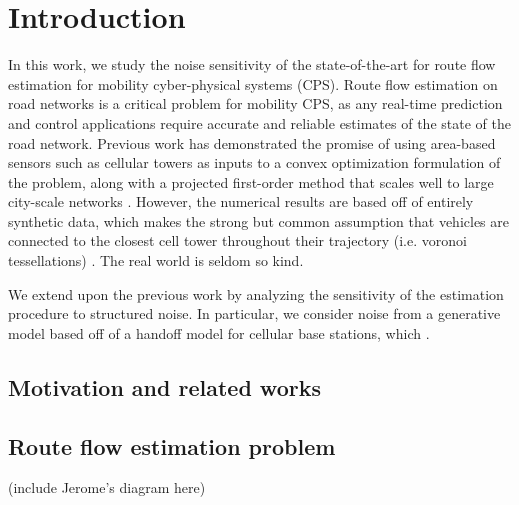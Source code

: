 
\section{Introduction}
In this work, we study the noise sensitivity of the state-of-the-art for route flow estimation for mobility cyber-physical systems (CPS). Route flow estimation on road networks is a critical problem for mobility CPS, as any real-time prediction and control applications require accurate and reliable estimates of the state of the road network. Previous work has demonstrated the promise of using area-based sensors such as cellular towers as inputs to a convex optimization formulation of the problem, along with a projected first-order method that scales well to large city-scale networks \cite{Wu2015}. However, the numerical results are based off of entirely synthetic data, which makes the strong but common assumption that vehicles are connected to the closest cell tower throughout their trajectory (i.e. voronoi tessellations) \cite{Voronoi1908}. The real world is seldom so kind.

We extend upon the previous work by analyzing the sensitivity of the estimation procedure to structured noise. In particular, we consider noise from a generative model based off of a handoff model for cellular base stations, which .
 

\subsection{Motivation and related works}

\subsection{Route flow estimation problem}

(include Jerome’s diagram here)

